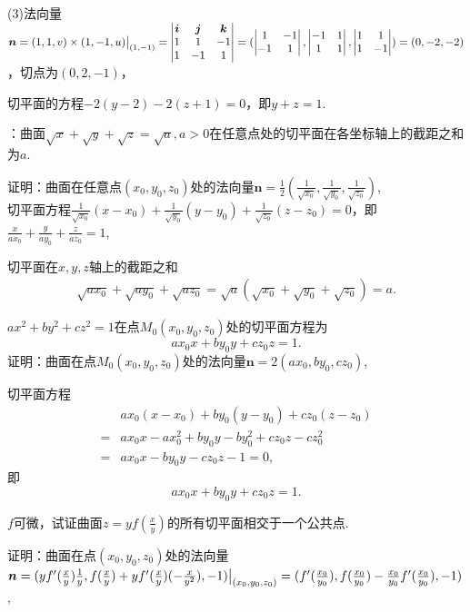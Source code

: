 \documentclass[12pt,UTF8]{ctexart}
\begin{document}
\begin{enumerate}
(3)法向量$\bm n=(1,1,v)\times(1,-1,u)\big|_{(1,-1)}=\begin{vmatrix}
\bm i&\bm j&\bm k\\
1&1&-1\\
1&-1&1
\end{vmatrix}=(\begin{vmatrix}
1&-1\\
-1&1
\end{vmatrix},\begin{vmatrix}
-1&1\\
1&1
\end{vmatrix},\begin{vmatrix}
1&1\\
1&-1
\end{vmatrix})\\
=(0,-2,-2)$，切点为$(0,2,-1)$，

切平面的方程$-2(y-2)-2(z+1)=0$，即$y+z=1$.

：曲面$\sqrt x+\sqrt y+\sqrt z=\sqrt a,a>0$在任意点处的切平面在各坐标轴上的截距之和为$a$.

证明：曲面在任意点$(x_0,y_0,z_0)$处的法向量$\bm n=\frac12(\frac1{\sqrt{x_0}},\frac1{\sqrt{y_0}},\frac1{\sqrt{z_0}})$,\\
切平面方程$\frac1{\sqrt{x_0}}(x-x_0)+\frac1{\sqrt{y_0}}(y-y_0)+\frac1{\sqrt{z_0}}(z-z_0)=0$，即$\frac x{ax_0}+\frac y{ay_0}+\frac z{az_0}=1$,

切平面在$x,y,z$轴上的截距之和
\[\begin{split}
\sqrt{ax_0}+\sqrt{ay_0}+\sqrt{az_0}=\sqrt a(\sqrt{x_0}+\sqrt{y_0}+\sqrt{z_0})=a.
\end{split}\]

$ax^2+by^2+cz^2=1$在点$M_0(x_0,y_0,z_0)$处的切平面方程为
\[
ax_0x+by_0y+cz_0z=1.
\]
证明：曲面在点$M_0(x_0,y_0,z_0)$处的法向量$\bm n=2(ax_0,by_0,cz_0)$,

切平面方程
\[\begin{split}
&ax_0(x-x_0)+by_0(y-y_0)+cz_0(z-z_0)\\
=&ax_0x-ax_0^2+by_0y-by_0^2+cz_0z-cz_0^2\\
=&ax_0x-by_0y-cz_0z-1=0,
\end{split}\]
即\[
ax_0x+by_0y+cz_0z=1.
\]

$f$可微，试证曲面$z=yf(\frac xy)$的所有切平面相交于一个公共点.

证明：曲面在点$(x_0,y_0,z_0)$处的法向量$\bm n=(yf'(\frac xy)\frac1y,f(\frac xy)+yf'(\frac xy)(-\frac x{y^2}),-1)\big|_{(x_0,y_0,z_0)}\\
=(f'(\frac{x_0}{y_0}),f(\frac{x_0}{y_0})-\frac{x_0}{y_0}f'(\frac{x_0}{y_0}),-1)$,


\end{enumerate}
\end{document}
